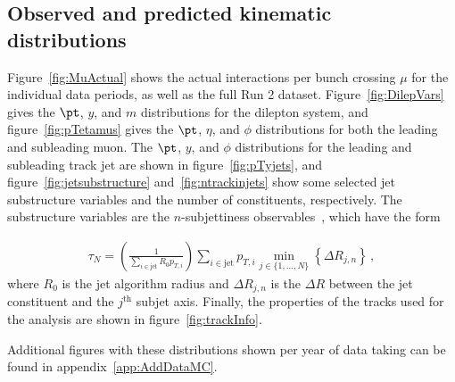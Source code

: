 \subsection{Observed and predicted kinematic distributions}
\label{sec:datamc}
Figure~\ref{fig:MuActual} shows the actual interactions per bunch crossing $\mu$ for the individual data periods, as well as the full Run 2 dataset.
Figure~\ref{fig:DilepVars} gives the $\pt$, $y$, and $m$ distributions for the dilepton system, and figure~\ref{fig:pTetamus} gives the $\pt$, $\eta$, and $\phi$ distributions for both the leading and subleading muon.
The $\pt$, $y$, and $\phi$ distributions for the leading and subleading track jet are shown in figure~\ref{fig:pTyjets}, and figure~\ref{fig:jetsubstructure} and~\ref{fig:ntrackinjets} show some
selected jet substructure variables and the number of constituents, respectively.  The substructure variables are the $n$-subjettiness observables~\cite{Thaler:2010tr,Thaler:2011gf}, which have the form

\begin{align}
\tau_N=\left(\frac{1}{\sum_{i\in\text{jet}} R_0p_{T,i}}\right)\sum_{i\in\text{jet}} p_{T,i}\min_{j\in\{1,...,N\}}\left\{\Delta R_{j,n}\right\}\,,
\end{align}
%
where $R_0$ is the jet algorithm radius and $\Delta R_{j,n}$ is the $\Delta R$ between the jet constituent and the $j^\text{th}$ subjet axis. Finally, the properties of the tracks used for the analysis are shown in figure~\ref{fig:trackInfo}.

Additional figures with these distributions shown per year of data taking can be found in appendix~\ref{app:AddDataMC}.


